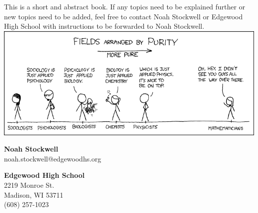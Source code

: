 This is a short and abstract book. If any topics need to be explained further or new topics need to be added, feel free to contact Noah Stockwell or Edgewood High School with instructions to be forwarded to Noah Stockwell.
\vfill
\includegraphics[width=\textwidth]{images/purity.png}
\vspace{.25in}
\par \textbf{Noah Stockwell}\\
noah.stockwell@edgewoodhs.org\\
\par \textbf{Edgewood High School}\\
2219 Monroe St.\\ Madison, WI 53711\\ (608) 257-1023